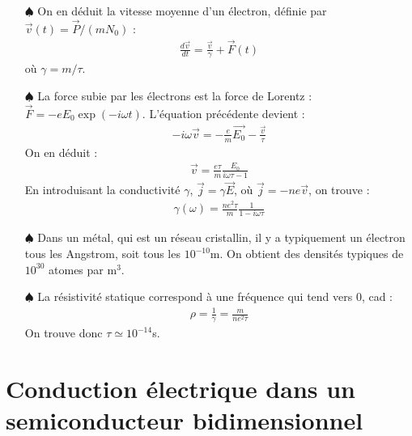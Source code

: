 \documentclass{report}
\begin{document}
\begin{itemize}
	\item[$\spadesuit$] On en déduit la vitesse moyenne d'un électron, définie par $\vec{v}(t)=\vec{P}/(mN_0)$ :
	\begin{align*}
		\frac{d\vec{v}}{dt}=\frac{\vec{v}}{\gamma}+\vec{F}(t)
	\end{align*}
	où $\gamma=m/\tau$.
	
	\item[$\spadesuit$] La force subie par les électrons est la force de Lorentz : $\vec{F}=-eE_0\exp(-i\omega t)$. L'équation précédente devient :
	\begin{align*}
		-i\omega\vec{v}=-\frac{e}{m}\vec{E_0}-\frac{\vec{v}}{\tau}
	\end{align*}
	On en déduit :
	\begin{align*}
		\vec{v}=\frac{e\tau}{m}\frac{E_0}{i\omega\tau-1}
	\end{align*}
	En introduisant la conductivité $\gamma$, $\vec{j}=\gamma \vec{E}$, où $\vec{j}=-ne\vec{v}$, on trouve :
	\begin{align*}
		\gamma(\omega)=\frac{ne^2\tau}{m}\frac{1}{1-i\omega\tau}
	\end{align*}
	
	\item[$\spadesuit$] Dans un métal, qui est un réseau cristallin, il y a typiquement un électron tous les Angstrom, soit tous les $10^{-10}$m. On obtient des densités typiques de $10^{30}$ atomes par m$^3$.
	
	\item[$\spadesuit$] La résistivité statique correspond à une fréquence qui tend vers 0, cad :
	\begin{align*}
		\rho = \frac{1}{\gamma}=\frac{m}{ne^2\tau}
	\end{align*}
	On trouve donc $\tau\simeq10^{-14}$s.
	
\end{itemize}

\newpage

\section*{Conduction électrique dans un semiconducteur bidimensionnel}
\end{document}
